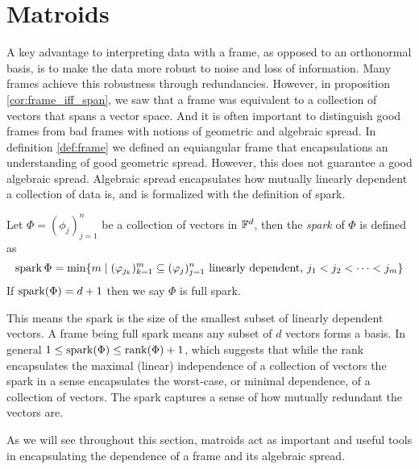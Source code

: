 \section{Matroids}
\label{sec:matroids}
A key advantage to interpreting data with a frame, as opposed to an orthonormal basis, is to make the data more robust to noise and loss of information. Many frames achieve this robustness through redundancies. However, in proposition \ref{cor:frame_iff_span}, we saw that a frame was equivalent to a collection of vectors that spans a vector space. And it is often important to distinguish good frames from bad frames with notions of geometric and algebraic spread. 
In definition \ref{def:frame} we defined an equiangular frame that encapsulations an understanding of good geometric spread. However, this does not guarantee a good algebraic spread. Algebraic spread encapsulates how mutually linearly dependent a collection of data is, and is formalized with the definition of spark.
\begin{Definition}
\label{def:spark}
Let $\Phi=(\phi_j)_{j=1}^n$ be a collection of vectors in $\mathbb{F}^d$, then the \textit{spark} of $\Phi$ is defined as
$$\operatorname{\mathrm{spark}}{\Phi}=\min\{m \;|\;(\varphi_{j_k})_{k=1}^m\subseteq (\varphi_j)_{j=1}^n \text{ linearly dependent, } j_1<j_2<\dots < j_m\}$$
If $\operatorname{\mathrm{spark}}(\Phi)=d+1$ then we say $\Phi$ is full spark.
\end{Definition}

This means the spark is the size of the smallest subset of linearly dependent vectors. A frame being full spark means any subset of $d$ vectors forms a basis. In general $1\leq \operatorname{\mathrm{spark}}(\Phi)\leq \operatorname{\mathrm{rank}}(\Phi)+1$, which suggests that while the rank encapsulates the maximal (linear) independence of a collection of vectors the spark in a sense encapsulates the worst-case, or minimal dependence, of a collection of vectors. The spark captures a sense of how mutually redundant the vectors are. 

As we will see throughout this section, matroids act as important and useful tools in encapsulating the dependence of a frame and its algebraic spread.

